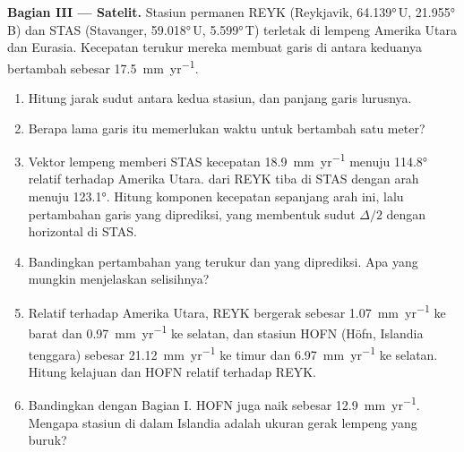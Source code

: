 \begin{problem}
\noindent\textbf{Bagian III --- Satelit.}
Stasiun permanen REYK (Reykjavik, \ang{64.139}\,U, \ang{21.955}\,B) dan STAS (Stavanger, \ang{59.018}\,U, \ang{5.599}\,T) terletak di lempeng Amerika Utara dan Eurasia. Kecepatan terukur mereka membuat garis di antara keduanya bertambah sebesar \qty{17.5}{mm.yr^{-1}}.
\begin{enumerate}[resume]
  \item Hitung jarak sudut antara kedua stasiun, dan panjang garis lurusnya.
  \item Berapa lama garis itu memerlukan waktu untuk bertambah satu meter?
  \item Vektor lempeng memberi STAS kecepatan \qty{18.9}{mm.yr^{-1}} menuju \ang{114.8} relatif terhadap Amerika Utara.  dari REYK tiba di STAS dengan arah menuju \ang{123.1}. Hitung komponen kecepatan sepanjang arah ini, lalu pertambahan garis yang diprediksi, yang membentuk sudut $\Delta/2$ dengan horizontal di STAS.
  \item Bandingkan pertambahan yang terukur dan yang diprediksi. Apa yang mungkin menjelaskan selisihnya?
  \item Relatif terhadap Amerika Utara, REYK bergerak sebesar \qty{1.07}{mm.yr^{-1}} ke barat dan \qty{0.97}{mm.yr^{-1}} ke selatan, dan stasiun HOFN (Höfn, Islandia tenggara) sebesar \qty{21.12}{mm.yr^{-1}} ke timur dan \qty{6.97}{mm.yr^{-1}} ke selatan. Hitung kelajuan dan  HOFN relatif terhadap REYK.
  \item Bandingkan dengan Bagian I. HOFN juga naik sebesar \qty{12.9}{mm.yr^{-1}}. Mengapa stasiun di dalam Islandia adalah ukuran gerak lempeng yang buruk?
\end{enumerate}


\end{problem}
